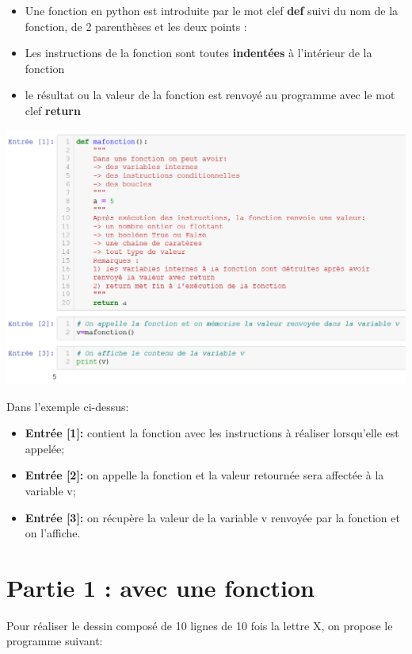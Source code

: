 \documentclass[11pt,a4paper]{article}
\begin{document}
\begin{itemize}
\item Une fonction en python est introduite par le mot clef \textbf{def} suivi du nom de la fonction, de 2 parenthèses et les deux points :
\item Les instructions de la fonction sont toutes \textbf{indentées} à l'intérieur de la fonction
\item le résultat ou la valeur de la fonction est renvoyé au programme avec le mot clef \textbf{return}
\end{itemize}
\begin{center}
\includegraphics[scale=0.66]{img/mafonction.png}
\end{center}
Dans l'exemple ci-dessus:
\begin{itemize}
\item \textbf{Entrée [1]:} contient la fonction avec les instructions à réaliser lorsqu'elle est appelée;
\item \textbf{Entrée [2]:} on appelle la fonction et la valeur retournée sera affectée à la variable v;
\item \textbf{Entrée [3]:} on récupère la valeur de la variable v renvoyée par la fonction et on l'affiche.
\end{itemize}

\newpage
\section*{Partie 1 : avec une fonction}
Pour réaliser le dessin composé de 10 lignes de 10 fois la lettre X, on propose le programme suivant:
\end{document}
